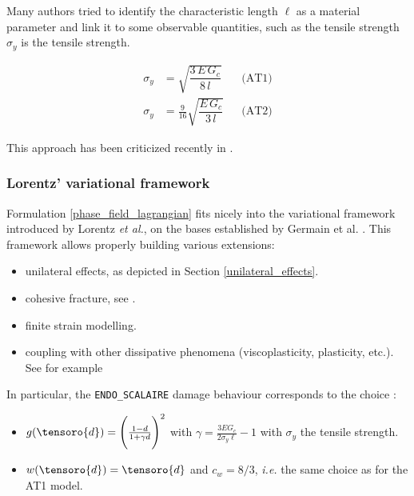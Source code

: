 Many authors tried to identify the characteristic length $\ell$ as a
material parameter and link it to some observable quantities, such as
the tensile strength $\sigma_{y}$ is the tensile strength.

\begin{equation}
    \begin{aligned}
        \sigma_{y} & =\sqrt{\dfrac{3\,E\,G_{c}}{8\,l}}
        &&
        \text{(AT1)}
        \\
        \sigma_{y} & =\frac{9}{16}\sqrt{\dfrac{E\,G_{c}}{3\,l}}
        &&
        \text{(AT2)}
    \end{aligned}
\end{equation}

This approach has been criticized recently in \cite{kumar_revisiting_2020}.

\subsubsection{Lorentz' variational framework}
\label{lorentz_variational_framework}

Formulation \eqref{phase_field_lagrangian} fits nicely into the variational
framework introduced by Lorentz \textit{et al.}, on the bases established by
Germain et al.
\cite{germain_continuum_1983, lorentz_variational_1999, lorentz_analysis_2003, forest_localization_2004}.
This framework allows properly building various extensions:

\begin{itemize}
    \item unilateral effects, as depicted in Section
    \ref{unilateral_effects}.
    \item cohesive fracture, see \cite{lorentz_convergence_2011, lorentz_nonlocal_2017}.
    \item finite strain modelling.
    \item coupling with other dissipative phenomena (viscoplasticity,
    plasticity, etc.). See for example \cite{2016_ZHANG_These, crabbe_gradient_2018}
\end{itemize}

In particular, the \texttt{ENDO\_SCALAIRE} damage behaviour corresponds to the choice \cite{edf_loi_2011}:

\begin{itemize}
    \item $g(\tensoro{d}) = \Bigg(\frac{1-d}{1+\gamma d}\Bigg)^{2}$ with $\gamma = \frac{3EG_c}{2 \sigma_y \ell} - 1$
    with $\sigma_{y}$ the tensile strength.
    \item $w(\tensoro{d}) = \tensoro{d}$ and $c_w=8/3$, \textit{i.e.} the same choice as for
    the AT1 model.
\end{itemize}

